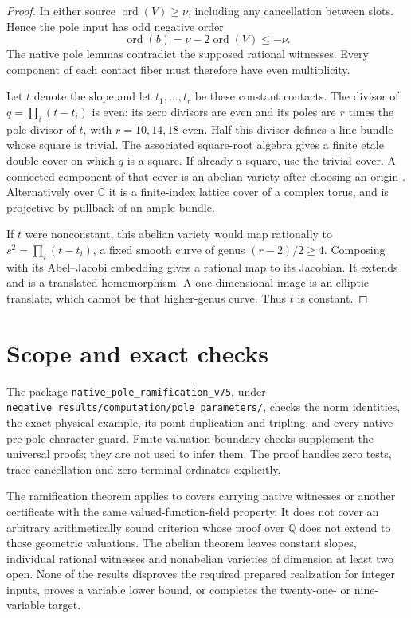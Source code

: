 \documentclass[11pt,a4paper]{article}
\newcommand{\Q}{\mathbb Q}\newcommand{\Z}{\mathbb Z}
\newcommand{\ord}{\operatorname{ord}}\newcommand{\PP}{\mathbb P}
\begin{document}
\begin{proof}
In either source $\ord(V)\ge\nu$, including any cancellation
between slots. Hence the pole input has odd negative order
\[
                         \ord(b)=\nu-2\ord(V)\le-\nu.
\]
The native pole lemmas contradict the supposed rational witnesses.
Every component of each contact fiber must therefore have even
multiplicity.

Let $t$ denote the slope and let $t_1,\ldots,t_r$ be these constant
contacts. The divisor of $q=\prod_i(t-t_i)$ is even: its zero
divisors are even and its poles are $r$ times the pole divisor of
$t$, with $r=10,14,18$ even. Half this divisor defines a line bundle
whose square is trivial. The associated square-root algebra gives
a finite etale double cover on which $q$ is a square. If already a
square, use the trivial cover. A connected component of that cover
is an abelian variety after choosing an origin
\cite[Chapter I, Remark 12.3]{Milne}. Alternatively over $\mathbb C$
it is a finite-index lattice cover of a complex torus, and is
projective by pullback of an ample bundle.

If $t$ were nonconstant, this abelian variety would map rationally
to $s^2=\prod_i(t-t_i)$, a fixed smooth curve of genus
$(r-2)/2\ge4$. Composing with its Abel--Jacobi embedding gives a
rational map to its Jacobian. It extends and is a translated
homomorphism. A one-dimensional image is an elliptic translate,
which cannot be that higher-genus curve. Thus $t$ is constant.
\end{proof}

\section{Scope and exact checks}
The package \texttt{native\_pole\_ramification\_v75}, under
\nolinkurl{negative_results/computation/pole_parameters/},
checks the norm identities, the exact physical example, its point
duplication and tripling, and every native pre-pole character guard.
Finite valuation boundary checks supplement the universal proofs;
they are not used to infer them. The proof handles zero tests, trace
cancellation and zero terminal ordinates explicitly.

The ramification theorem applies to covers carrying native witnesses
or another certificate with the same valued-function-field property.
It does not cover an arbitrary arithmetically sound criterion whose
proof over $\Q$ does not extend to those geometric valuations.
The abelian theorem leaves constant slopes, individual rational
witnesses and nonabelian varieties of dimension at least two open.
None of the results disproves the required prepared realization for
integer inputs, proves a variable lower bound, or completes the
twenty-one- or nine-variable target.
\end{document}

